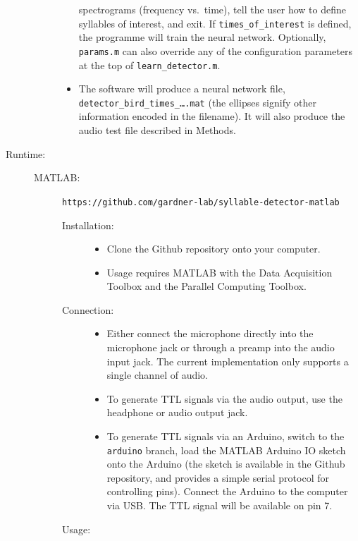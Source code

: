 \documentclass[10pt,letterpaper]{article}
\begin{document}
\begin{description}
\begin{description}
\begin{itemize}
      spectrograms (frequency vs.~time), tell the user how to define
      syllables of interest, and exit.  If {\tt times\_of\_interest}
      is defined, the programme will train the neural network.
      Optionally, {\tt params.m} can also override any of the
      configuration parameters at the top of {\tt learn\_detector.m}.
    \item The software will produce a neural network file, {\tt
      detector\_bird\_times\_\dots.mat} (the ellipses signify other
      information encoded in the filename).  It will also produce the
      audio test file described in Methods.
    \end{itemize}
  \end{description}
  
\item[Runtime:]\hfill
  \begin{description}
  \item[MATLAB:] {\tt https://github.com/gardner-lab/syllable-detector-matlab}
    \begin{description}
    \item[Installation:]\hfill
      \begin{itemize}
      \item Clone the Github repository onto your computer.
      \item Usage requires MATLAB with the Data Acquisition Toolbox and the 
      Parallel Computing Toolbox.
      \end{itemize}
    \item[Connection:]\hfill
      \begin{itemize}
      \item Either connect the microphone directly into the microphone jack or through a 
      preamp into the audio input jack. The current implementation only supports a single 
      channel of audio.
      \item To generate TTL signals via the audio output, use the headphone or audio output
      jack.
      \item To generate TTL signals via an Arduino, switch to the {\tt arduino} branch, 
      load the MATLAB Arduino IO sketch onto the Arduino (the sketch is available in the 
      Github repository, and provides a simple serial protocol for controlling pins). 
      Connect the Arduino to the computer via USB. The TTL signal will be available on
      pin 7.
      \end{itemize}
    \item[Usage:]\hfill
      \begin{itemize}

\end{itemize}
\end{description}
\end{description}
\end{description}
\end{document}
